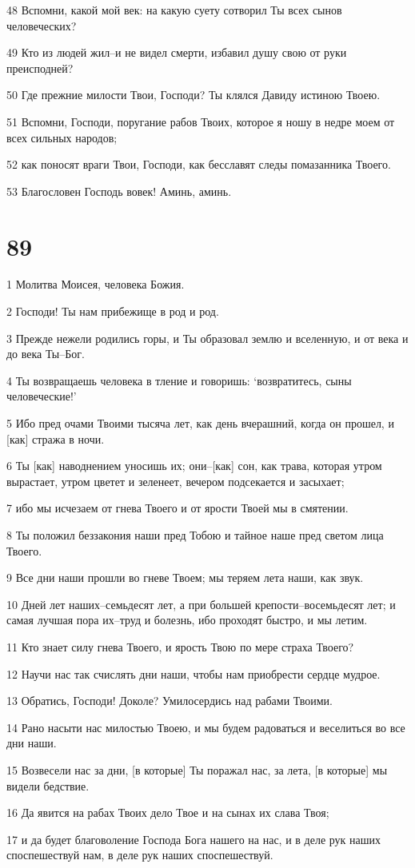 \par 48 Вспомни, какой мой век: на какую суету сотворил Ты всех сынов человеческих?
\par 49 Кто из людей жил--и не видел смерти, избавил душу свою от руки преисподней?
\par 50 Где прежние милости Твои, Господи? Ты клялся Давиду истиною Твоею.
\par 51 Вспомни, Господи, поругание рабов Твоих, которое я ношу в недре моем от всех сильных народов;
\par 52 как поносят враги Твои, Господи, как бесславят следы помазанника Твоего.
\par 53 Благословен Господь вовек! Аминь, аминь.

\chapter{89}

\par 1 Молитва Моисея, человека Божия.
\par 2 Господи! Ты нам прибежище в род и род.
\par 3 Прежде нежели родились горы, и Ты образовал землю и вселенную, и от века и до века Ты--Бог.
\par 4 Ты возвращаешь человека в тление и говоришь: `возвратитесь, сыны человеческие!'
\par 5 Ибо пред очами Твоими тысяча лет, как день вчерашний, когда он прошел, и [как] стража в ночи.
\par 6 Ты [как] наводнением уносишь их; они--[как] сон, как трава, которая утром вырастает, утром цветет и зеленеет, вечером подсекается и засыхает;
\par 7 ибо мы исчезаем от гнева Твоего и от ярости Твоей мы в смятении.
\par 8 Ты положил беззакония наши пред Тобою и тайное наше пред светом лица Твоего.
\par 9 Все дни наши прошли во гневе Твоем; мы теряем лета наши, как звук.
\par 10 Дней лет наших--семьдесят лет, а при большей крепости--восемьдесят лет; и самая лучшая пора их--труд и болезнь, ибо проходят быстро, и мы летим.
\par 11 Кто знает силу гнева Твоего, и ярость Твою по мере страха Твоего?
\par 12 Научи нас так счислять дни наши, чтобы нам приобрести сердце мудрое.
\par 13 Обратись, Господи! Доколе? Умилосердись над рабами Твоими.
\par 14 Рано насыти нас милостью Твоею, и мы будем радоваться и веселиться во все дни наши.
\par 15 Возвесели нас за дни, [в которые] Ты поражал нас, за лета, [в которые] мы видели бедствие.
\par 16 Да явится на рабах Твоих дело Твое и на сынах их слава Твоя;
\par 17 и да будет благоволение Господа Бога нашего на нас, и в деле рук наших споспешествуй нам, в деле рук наших споспешествуй.

